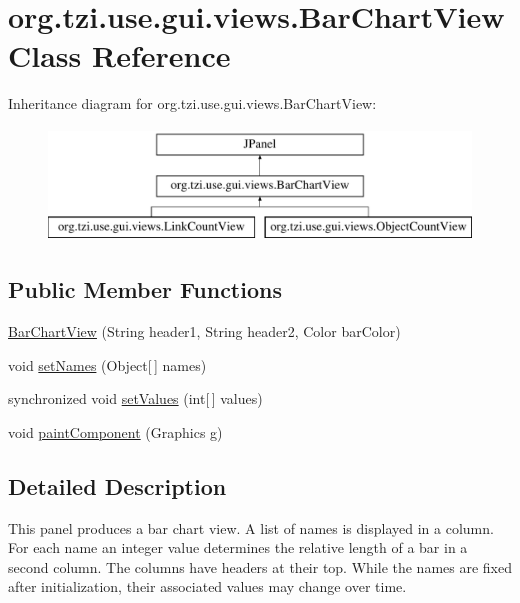 \hypertarget{classorg_1_1tzi_1_1use_1_1gui_1_1views_1_1_bar_chart_view}{\section{org.\-tzi.\-use.\-gui.\-views.\-Bar\-Chart\-View Class Reference}
\label{classorg_1_1tzi_1_1use_1_1gui_1_1views_1_1_bar_chart_view}
}
Inheritance diagram for org.\-tzi.\-use.\-gui.\-views.\-Bar\-Chart\-View\-:\begin{figure}[H]
\begin{center}
\leavevmode
\includegraphics[height=3.000000cm]{classorg_1_1tzi_1_1use_1_1gui_1_1views_1_1_bar_chart_view}
\end{center}
\end{figure}
\subsection*{Public Member Functions}
\begin{DoxyCompactItemize}
\item 
\hyperlink{classorg_1_1tzi_1_1use_1_1gui_1_1views_1_1_bar_chart_view_a379b62aa5765c79c38b867bb1bb7bbe6}{Bar\-Chart\-View} (String header1, String header2, Color bar\-Color)
\item 
void \hyperlink{classorg_1_1tzi_1_1use_1_1gui_1_1views_1_1_bar_chart_view_a74bf6599857bc092f414263718281c0b}{set\-Names} (Object\mbox{[}$\,$\mbox{]} names)
\item 
synchronized void \hyperlink{classorg_1_1tzi_1_1use_1_1gui_1_1views_1_1_bar_chart_view_a96f8c95369cea462b131730656ebac81}{set\-Values} (int\mbox{[}$\,$\mbox{]} values)
\item 
void \hyperlink{classorg_1_1tzi_1_1use_1_1gui_1_1views_1_1_bar_chart_view_a6d5271d74a24060c33f7de2c3bc397d8}{paint\-Component} (Graphics g)
\end{DoxyCompactItemize}


\subsection{Detailed Description}
This panel produces a bar chart view. A list of names is displayed in a column. For each name an integer value determines the relative length of a bar in a second column. The columns have headers at their top. While the names are fixed after initialization, their associated values may change over time.

